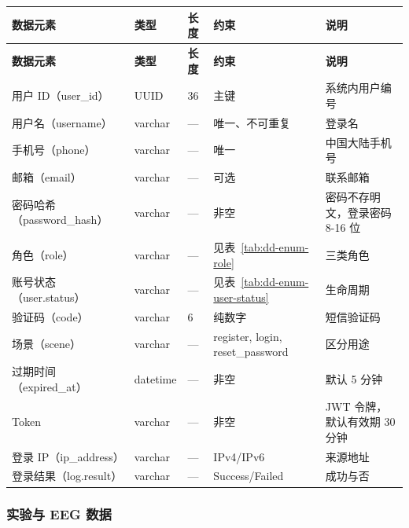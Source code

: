 {\small
\begin{longtable}{|p{32mm}|p{20mm}|p{16mm}|p{24mm}|p{42mm}|}
\hline
\textbf{数据元素} & \textbf{类型} & \textbf{长度} & \textbf{约束} & \textbf{说明}\\\hline
\endfirsthead
\hline
\textbf{数据元素} & \textbf{类型} & \textbf{长度} & \textbf{约束} & \textbf{说明}\\\hline
\endhead
用户 ID（user\_id）& UUID & 36 & 主键 & 系统内用户编号 \\ \hline
用户名（username）& varchar & --- & 唯一、不可重复 & 登录名 \\ \hline
手机号（phone）& varchar & --- & 唯一 & 中国大陆手机号 \\ \hline
邮箱（email）& varchar & --- & 可选 & 联系邮箱 \\ \hline
密码哈希（password\_hash）& varchar & --- & 非空 & 密码不存明文，登录密码 8-16 位 \\ \hline
角色（role）& varchar & --- & 见表~\ref{tab:dd-enum-role} & 三类角色 \\ \hline
账号状态（user.status）& varchar & --- & 见表~\ref{tab:dd-enum-user-status} & 生命周期 \\ \hline
验证码（code）& varchar & 6 & 纯数字 & 短信验证码 \\ \hline
场景（scene）& varchar & --- & register, login, reset\_\allowbreak password & 区分用途 \\ \hline
过期时间（expired\_at）& datetime & --- & 非空 & 默认 5 分钟 \\ \hline
Token & varchar & --- & 非空 & JWT 令牌，默认有效期 30 分钟 \\ \hline
登录 IP（ip\_address）& varchar & --- & IPv4/IPv6 & 来源地址 \\ \hline
登录结果（log.result）& varchar & --- & Success/Failed & 成功与否 \\ \hline
\end{longtable}
}

\subsubsection{实验与 EEG 数据}


